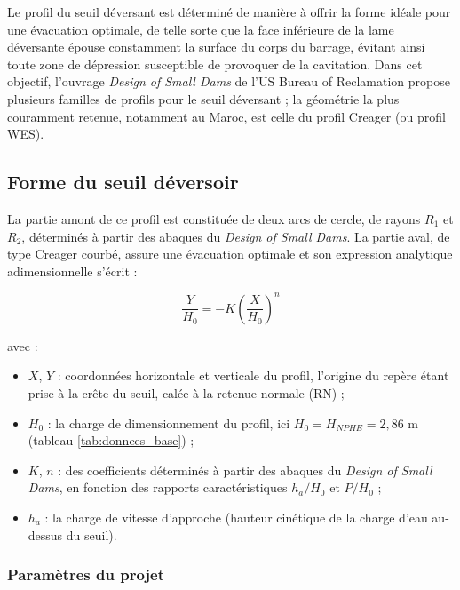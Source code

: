 Le profil du seuil déversant est déterminé de manière à offrir la forme idéale pour une évacuation optimale, de telle sorte que la face inférieure de la lame déversante épouse constamment la surface du corps du barrage, évitant ainsi toute zone de dépression susceptible de provoquer de la cavitation. Dans cet objectif, l'ouvrage \textit{Design of Small Dams} de l'US Bureau of Reclamation \cite{usbr1987design} propose plusieurs familles de profils pour le seuil déversant ; la géométrie la plus couramment retenue, notamment au Maroc, est celle du profil Creager (ou profil WES).

\subsection{Forme du seuil déversoir}
\label{subsec:forme_seuil_deversoir}

La partie amont de ce profil est constituée de deux arcs de cercle, de rayons $R_1$ et $R_2$, déterminés à partir des abaques du \textit{Design of Small Dams}. La partie aval, de type Creager courbé, assure une évacuation optimale et son expression analytique adimensionnelle s'écrit \cite{usbr1987design} :

\begin{equation}
\frac{Y}{H_0} = -K \left(\frac{X}{H_0}\right)^{n}
\label{eq:creager_general_kn}
\end{equation}

avec :
\begin{itemize}
    \item $X$, $Y$ : coordonnées horizontale et verticale du profil, l'origine du repère étant prise à la crête du seuil, calée à la retenue normale (RN) ;
    \item $H_0$ : la charge de dimensionnement du profil, ici $H_0 = H_{NPHE} = 2{,}86$ m (tableau \ref{tab:donnees_base}) ;
    \item $K$, $n$ : des coefficients déterminés à partir des abaques du \textit{Design of Small Dams}, en fonction des rapports caractéristiques $h_a/H_0$ et $P/H_0$ ;
    \item $h_a$ : la charge de vitesse d'approche (hauteur cinétique de la charge d'eau au-dessus du seuil).
\end{itemize}

\subsubsection{Paramètres du projet}
\label{subsubsec:parametres_projet_creager}

